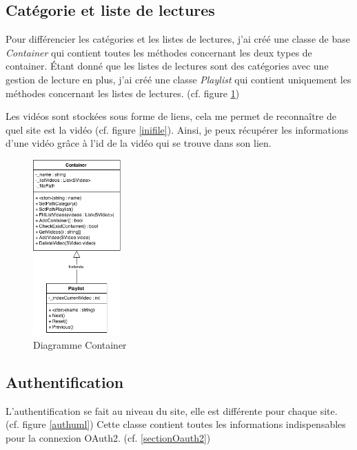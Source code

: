 \documentclass[11pt]{report} %
\begin{document}
			\subsection{Catégorie et liste de lectures}
			Pour différencier les catégories et les listes de lectures, j'ai créé une classe de base \textit{Container} qui contient toutes les méthodes concernant les deux types de container.
			Étant donné que les listes de lectures sont des catégories avec une gestion de lecture en plus, j'ai créé une classe \textit{Playlist} qui contient uniquement les méthodes concernant les listes de lectures. (cf. figure \ref{Container})
			
			Les vidéos sont stockées sous forme de liens, cela me permet de reconnaître de quel site est la vidéo (cf. figure \ref{inifile}). Ainsi, je peux récupérer les informations d'une vidéo grâce à l'id de la vidéo qui se trouve dans son lien.
				
			\begin{figure}[h]
				\center
				\includegraphics[width=0.3\textwidth]{../img/Container.png}
				\caption{Diagramme Container}
				\label{Container}
			\end{figure}
			
			\newpage 
			\subsection{Authentification}
			L'authentification se fait au niveau du site, elle est différente pour chaque site. (cf. figure \ref{authuml})
			Cette classe contient toutes les informations indispensables pour la connexion OAuth2. (cf. \ref{sectionOauth2})
			
\end{document}
